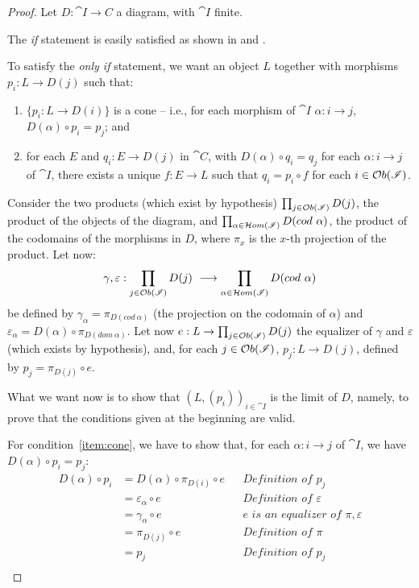 \documentclass[a4paper, twoside,openright]{report}
\theoremstyle{plain}
\theoremstyle{definition}
\begin{document}
\begin{proof}
    Let $D: \cat{I \rightarrow C}$ a diagram, with $\cat I$ finite.
    
    The \emph{if} statement is easily satisfied as shown in  and .

    To satisfy the \emph{only if} statement, we want an object $L$ together with morphisms $p_i : L \rightarrow D(j)$ such that:
    \begin{enumerate}
        \item\label{item:cone} $\{p_i: L \rightarrow D(i)\}$ is a cone -- i.e., for each morphism of $\cat I$ $\alpha : i \rightarrow j$, $D(\alpha) \circ p_i = p_j$; and
        \item\label{item:univ_prop} for each $E$ and $q_i : E \rightarrow D(j)$ in $\cat C$, with $D(\alpha) \circ q_i = q_j$ for each $\alpha : i \rightarrow j$ of $\cat I$, there exists a unique $f: E \rightarrow L$ such that $q_i = p_i \circ f$ for each $i \in \mathcal{O}b(\mathscr{I})$.
    \end{enumerate}

    Consider the two products (which exist by hypothesis) $\prod_{j \in \mathcal{O}b(\mathscr{I})} D(j)$, the product of the objects of the diagram, and $\prod_{\alpha \in \Hom(\cat I)}D(cod \ \alpha)$, the product of the codomains of the morphisms in $D$, where $\pi_x$ is the $x$-th projection of the product.
    Let now:
    \[
        \gamma, \varepsilon : \prod_{j \in \mathcal{O}b(\mathscr{I})}D(j) \ \longrightarrow \prod_{\alpha \in \mathcal{H}om(\mathscr{I})} D(cod \ \alpha)
    \]
    be defined by $\gamma_\alpha = \pi_{D(cod\ \alpha)}$ (the projection on the codomain of $\alpha$) and $\varepsilon_\alpha = D(\alpha) \circ \pi_{D(dom \ \alpha)}$.
    Let now $e: L \rightarrow \prod_{j \in \mathcal{O}b(\mathscr{I})}D(j)$ the equalizer of $\gamma$ and $\varepsilon$ (which exists by hypothesis), and, for each $j \in \mathcal{O}b(\mathscr{I})$, $p_j: L \rightarrow D(j)$, defined by $p_j = \pi_{D(j)} \circ e$.
    
    What we want now is to show that $(L, (p_i))_{i \in \cat I}$ is the limit of $D$, namely, to prove that the conditions given at the beginning are valid.

    For condition~\ref{item:cone}, we have to show that, for each $\alpha : i \rightarrow j$ of $\cat I$, we have $D(\alpha) \circ p_i = p_j$:
    \begin{align*}
        D(\alpha) \circ p_i 
            &= D(\alpha) \circ \pi_{D(i)} \circ e   && \textit{Definition of $p_j$} \\
            &= \varepsilon_{\alpha} \circ e         && \textit{Definition of $\varepsilon$}\\
            &= \gamma_\alpha \circ e                && \textit{$e$ is an equalizer of $\pi, \varepsilon$}\\
            &= \pi_{D(j)} \circ e                   && \textit{Definition of $\pi$} \\
            &= p_j                                  && \textit{Definition of $p_j$} \\
    \end{align*}


\end{proof}
\end{document}
